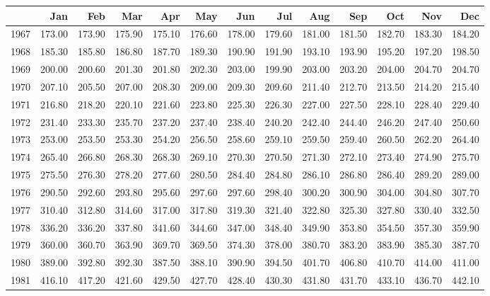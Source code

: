 \begin{longtable}{rrrrrrrrrrrrr}
  \hline
 & Jan & Feb & Mar & Apr & May & Jun & Jul & Aug & Sep & Oct & Nov & Dec \\ 
  \hline
1967 & 173.00 & 173.90 & 175.90 & 175.10 & 176.60 & 178.00 & 179.60 & 181.00 & 181.50 & 182.70 & 183.30 & 184.20 \\ 
  1968 & 185.30 & 185.80 & 186.80 & 187.70 & 189.30 & 190.90 & 191.90 & 193.10 & 193.90 & 195.20 & 197.20 & 198.50 \\ 
  1969 & 200.00 & 200.60 & 201.30 & 201.80 & 202.30 & 203.00 & 199.90 & 203.00 & 203.20 & 204.00 & 204.70 & 204.70 \\ 
  1970 & 207.10 & 205.50 & 207.00 & 208.30 & 209.00 & 209.30 & 209.60 & 211.40 & 212.70 & 213.50 & 214.20 & 215.40 \\ 
  1971 & 216.80 & 218.20 & 220.10 & 221.60 & 223.80 & 225.30 & 226.30 & 227.00 & 227.50 & 228.10 & 228.40 & 229.40 \\ 
  1972 & 231.40 & 233.30 & 235.70 & 237.20 & 237.40 & 238.40 & 240.20 & 242.40 & 244.40 & 246.20 & 247.40 & 250.60 \\ 
  1973 & 253.00 & 253.50 & 253.30 & 254.20 & 256.50 & 258.60 & 259.10 & 259.50 & 259.40 & 260.50 & 262.20 & 264.40 \\ 
  1974 & 265.40 & 266.80 & 268.30 & 268.30 & 269.10 & 270.30 & 270.50 & 271.30 & 272.10 & 273.40 & 274.90 & 275.70 \\ 
  1975 & 275.50 & 276.30 & 278.20 & 277.60 & 280.50 & 284.40 & 284.80 & 286.10 & 286.80 & 286.40 & 289.20 & 289.00 \\ 
  1976 & 290.50 & 292.60 & 293.80 & 295.60 & 297.60 & 297.60 & 298.40 & 300.20 & 300.90 & 304.00 & 304.80 & 307.70 \\ 
  1977 & 310.40 & 312.80 & 314.60 & 317.00 & 317.80 & 319.30 & 321.40 & 322.80 & 325.30 & 327.80 & 330.40 & 332.50 \\ 
  1978 & 336.20 & 336.20 & 337.80 & 341.60 & 344.60 & 347.00 & 348.40 & 349.90 & 353.80 & 354.50 & 357.30 & 359.90 \\ 
  1979 & 360.00 & 360.70 & 363.90 & 369.70 & 369.50 & 374.30 & 378.00 & 380.70 & 383.20 & 383.90 & 385.30 & 387.70 \\ 
  1980 & 389.00 & 392.80 & 392.30 & 387.50 & 388.10 & 390.90 & 394.50 & 401.70 & 406.80 & 410.70 & 414.00 & 411.00 \\ 
  1981 & 416.10 & 417.20 & 421.60 & 429.50 & 427.70 & 428.40 & 430.30 & 431.80 & 431.70 & 433.10 & 436.70 & 442.10 \\ 

\end{longtable}
